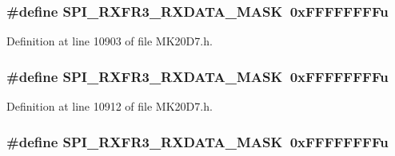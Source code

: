 \subsubsection[{\texorpdfstring{S\+P\+I\+\_\+\+R\+X\+F\+R3\+\_\+\+R\+X\+D\+A\+T\+A\+\_\+\+M\+A\+SK}{SPI_RXFR3_RXDATA_MASK}}]{\setlength{\rightskip}{0pt plus 5cm}\#define S\+P\+I\+\_\+\+R\+X\+F\+R3\+\_\+\+R\+X\+D\+A\+T\+A\+\_\+\+M\+A\+SK~0x\+F\+F\+F\+F\+F\+F\+F\+Fu}\hypertarget{group___s_p_i___register___masks_ga06579b6d579b820152dd81435d71c09e}{}\label{group___s_p_i___register___masks_ga06579b6d579b820152dd81435d71c09e}


Definition at line 10903 of file M\+K20\+D7.\+h.

\subsubsection[{\texorpdfstring{S\+P\+I\+\_\+\+R\+X\+F\+R3\+\_\+\+R\+X\+D\+A\+T\+A\+\_\+\+M\+A\+SK}{SPI_RXFR3_RXDATA_MASK}}]{\setlength{\rightskip}{0pt plus 5cm}\#define S\+P\+I\+\_\+\+R\+X\+F\+R3\+\_\+\+R\+X\+D\+A\+T\+A\+\_\+\+M\+A\+SK~0x\+F\+F\+F\+F\+F\+F\+F\+Fu}\hypertarget{group___s_p_i___register___masks_ga06579b6d579b820152dd81435d71c09e}{}\label{group___s_p_i___register___masks_ga06579b6d579b820152dd81435d71c09e}


Definition at line 10912 of file M\+K20\+D7.\+h.

\subsubsection[{\texorpdfstring{S\+P\+I\+\_\+\+R\+X\+F\+R3\+\_\+\+R\+X\+D\+A\+T\+A\+\_\+\+M\+A\+SK}{SPI_RXFR3_RXDATA_MASK}}]{\setlength{\rightskip}{0pt plus 5cm}\#define S\+P\+I\+\_\+\+R\+X\+F\+R3\+\_\+\+R\+X\+D\+A\+T\+A\+\_\+\+M\+A\+SK~0x\+F\+F\+F\+F\+F\+F\+F\+Fu}\hypertarget{group___s_p_i___register___masks_ga06579b6d579b820152dd81435d71c09e}{}\label{group___s_p_i___register___masks_ga06579b6d579b820152dd81435d71c09e}


